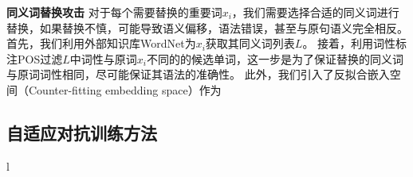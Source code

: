 \textbf{同义词替换攻击} 对于每个需要替换的重要词$x_i$，我们需要选择合适的同义词进行替换，如果替换不慎，可能导致语义偏移，语法错误，甚至与原句语义完全相反。
首先，我们利用外部知识库WordNet\cite{miller1995wordnet}为$x_i$获取其同义词列表$L$。
接着，利用词性标注POS过滤$L$中词性与原词$x_i$不同的的候选单词，这一步是为了保证替换的同义词与原词词性相同，尽可能保证其语法的准确性。
此外，我们引入了反拟合嵌入空间（Counter-fitting embedding space）作为


\subsection{自适应对抗训练方法}









l






% 


